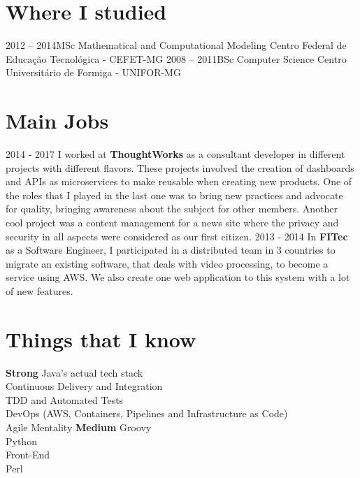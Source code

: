 \documentclass[]{friggeri-cv}
\begin{document}
\section{Where I studied}
\begin{entrylist}
   \entry
    {2012 – 2014}{MSc {} Mathematical and Computational Modeling}{}
    {\normalfont Centro Federal de Educação Tecnológica - CEFET-MG}
  \entry
    {2008 – 2011}{BSc {} Computer Science}{}
    {\normalfont Centro Universitário de Formiga - UNIFOR-MG}
\end{entrylist}

\section{Main Jobs}
    \begin{entrylist}
        \entry
            {2014 - 2017}
            {{\normalfont I worked at \textbf{ThoughtWorks} as a consultant developer in different projects with different flavors.
            These projects involved the creation of dashboards and APIs as microservices to make reusable when creating new products.
            One of the roles that I played in the last one was to bring new practices and advocate for quality, bringing awareness about the subject for other members.
            Another cool project was a content management for a news site where the privacy and security in all aspects were considered as our first citizen.
            }}{}{}
        \entry
            {2013 - 2014}
            {{\normalfont In \textbf{FITec} as a Software Engineer, I participated in a distributed team in 3 countries to migrate an existing software, that deals with video processing, to become a service using AWS. We also create one web application to this system with a lot of new features.
            }}{}{}
    \end{entrylist}

\section{Things that I know}
    \begin{entrylist}
        \entry
            {\textbf{Strong}}
            {{\normalfont Java's actual tech stack\\
            Continuous Delivery and Integration\\ 
            TDD and Automated Tests\\
            DevOps (AWS, Containers, Pipelines and Infrastructure as Code)\\ 
            Agile Mentality}}{}{}
        \entry
            {\textbf{Medium}}
            {{\normalfont Groovy\\
            Python\\
            Front-End\\
            Perl
            }}{}{}
    \end{entrylist}
\end{document}
